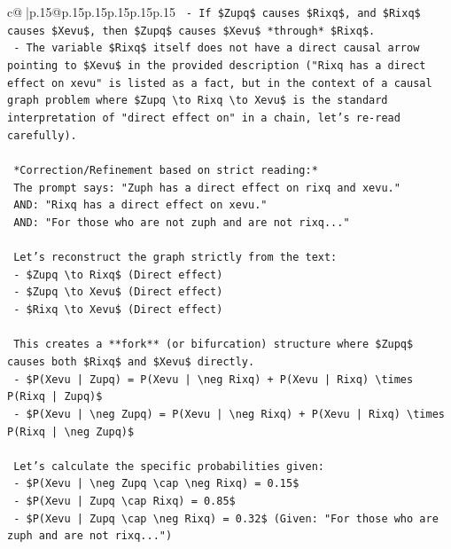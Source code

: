 \documentclass{article}
\begin{document}
{\begin{supertabular}{c@{$\;$}|p{.15\linewidth}@{}p{.15\linewidth}p{.15\linewidth}p{.15\linewidth}p{.15\linewidth}p{.15\linewidth}}
{{{\texttt{    {-} If \$Zupq\$ causes \$Rixq\$, and \$Rixq\$ causes \$Xevu\$, then \$Zupq\$ causes \$Xevu\$ *through* \$Rixq\$.} \\
\texttt{    {-} The variable \$Rixq\$ itself does not have a direct causal arrow pointing to \$Xevu\$ in the provided description ("Rixq has a direct effect on xevu" is listed as a fact, but in the context of a causal graph problem where \$Zupq \textbackslash{}to Rixq \textbackslash{}to Xevu\$ is the standard interpretation of "direct effect on" in a chain, let's re{-}read carefully).} \\
\\ 
\texttt{    *Correction/Refinement based on strict reading:*} \\
\texttt{    The prompt says: "Zuph has a direct effect on rixq and xevu."} \\
\texttt{    AND: "Rixq has a direct effect on xevu."} \\
\texttt{    AND: "For those who are not zuph and are not rixq..."} \\
\\ 
\texttt{    Let's reconstruct the graph strictly from the text:} \\
\texttt{    {-} \$Zupq \textbackslash{}to Rixq\$ (Direct effect)} \\
\texttt{    {-} \$Zupq \textbackslash{}to Xevu\$ (Direct effect)} \\
\texttt{    {-} \$Rixq \textbackslash{}to Xevu\$ (Direct effect)} \\
\\ 
\texttt{    This creates a **fork** (or bifurcation) structure where \$Zupq\$ causes both \$Rixq\$ and \$Xevu\$ directly.} \\
\texttt{    {-} \$P(Xevu | Zupq) = P(Xevu | \textbackslash{}neg Rixq) + P(Xevu | Rixq) \textbackslash{}times P(Rixq | Zupq)\$} \\
\texttt{    {-} \$P(Xevu | \textbackslash{}neg Zupq) = P(Xevu | \textbackslash{}neg Rixq) + P(Xevu | Rixq) \textbackslash{}times P(Rixq | \textbackslash{}neg Zupq)\$} \\
\\ 
\texttt{    Let's calculate the specific probabilities given:} \\
\texttt{    {-} \$P(Xevu | \textbackslash{}neg Zupq \textbackslash{}cap \textbackslash{}neg Rixq) = 0.15\$} \\
\texttt{    {-} \$P(Xevu | Zupq \textbackslash{}cap Rixq) = 0.85\$} \\
\texttt{    {-} \$P(Xevu | Zupq \textbackslash{}cap \textbackslash{}neg Rixq) = 0.32\$ (Given: "For those who are zuph and are not rixq...")} \\
}}}
\end{supertabular}}
\end{document}
